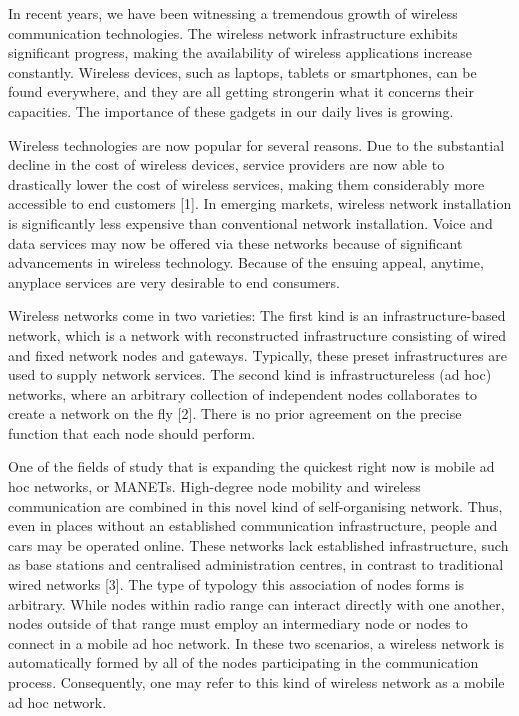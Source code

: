 \documentclass[10pt]{NSP1}
\begin{document}
In recent years, we have been witnessing a tremendous growth of wireless communication technologies. The wireless network infrastructure exhibits significant progress, making the availability of wireless applications increase constantly. Wireless devices, such as laptops, tablets or smartphones, can be found everywhere, and they are all getting strongerin what it concerns their capacities. The importance of these gadgets in our daily lives is growing.

Wireless technologies are now popular for several reasons. Due to the substantial decline in the cost of wireless devices, service providers are now able to drastically lower the cost of wireless services, making them considerably more accessible to end customers [1]. In emerging markets, wireless network installation is significantly less expensive than conventional network installation. Voice and data services may now be offered via these networks because of significant advancements in wireless technology. Because of the ensuing appeal, anytime, anyplace services are very desirable to end consumers.

Wireless networks come in two varieties: The first kind is an infrastructure-based network, which is a network with reconstructed infrastructure consisting of wired and fixed network nodes and gateways. Typically, these preset infrastructures are used to supply network services. The second kind is infrastructureless (ad hoc) networks, where an arbitrary collection of independent nodes collaborates to create a network on the fly [2]. There is no prior agreement on the precise function that each node should perform.

One of the fields of study that is expanding the quickest right now is mobile ad hoc networks, or MANETs. High-degree node mobility and wireless communication are combined in this novel kind of self-organising network. Thus, even in places without an established communication infrastructure, people and cars may be operated online. These networks lack established infrastructure, such as base stations and centralised administration centres, in contrast to traditional wired networks [3]. The type of typology this association of nodes forms is arbitrary. While nodes within radio range can interact directly with one another, nodes outside of that range must employ an intermediary node or nodes to connect in a mobile ad hoc network. In these two scenarios, a wireless network is automatically formed by all of the nodes participating in the communication process. Consequently, one may refer to this kind of wireless network as a mobile ad hoc network.
\end{document}
